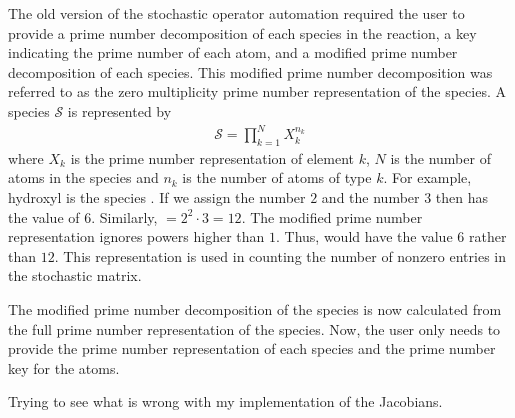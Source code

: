 The old version of the stochastic operator automation required the user to provide a prime number decomposition of each species in the reaction, a key indicating the prime number of each atom, and a modified prime number decomposition of each species.  This modified prime number decomposition was referred to as the zero multiplicity prime number representation of the species.  
A species $\mathcal{S}$ is represented by
\begin{align*}
  \mathcal{S} = \prod_{k=1}^{N}{X_{k}^{n_{k}}}
\end{align*}
where $X_{k}$ is the prime number representation of element $k$, $N$ is the number of atoms in the species and $n_{k}$ is the number of atoms of type $k$.  For example, hydroxyl is the species .  If we assign  the number $2$ and  the number $3$ then  has the value of $6$.  Similarly,  $= 2^{2}\cdot 3 = 12$.  The modified prime number representation ignores powers higher than $1$.  Thus,  would have the value $6$ rather than $12$.  This representation is used in counting the number of nonzero entries in the stochastic matrix.

The modified prime number decomposition of the species is now calculated from the full prime number representation of the species.  Now, the user only needs to provide the prime number representation of each species and the prime number key for the atoms.

Trying to see what is wrong with my implementation of the Jacobians.

